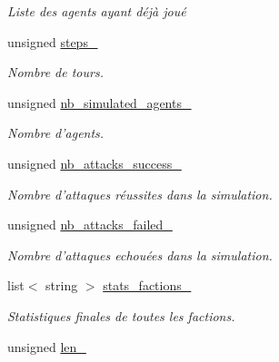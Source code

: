 \begin{DoxyCompactItemize}
\begin{DoxyCompactList}\small\item\em Liste des agents ayant déjà joué \end{DoxyCompactList}\item 
\hypertarget{classWorld_a747132820aba737926418d482571d7d3}{unsigned \hyperlink{classWorld_a747132820aba737926418d482571d7d3}{steps\-\_\-}}\label{classWorld_a747132820aba737926418d482571d7d3}

\begin{DoxyCompactList}\small\item\em Nombre de tours. \end{DoxyCompactList}\item 
\hypertarget{classWorld_a171ee3cda37e3f0d643407d7f5e22a4e}{unsigned \hyperlink{classWorld_a171ee3cda37e3f0d643407d7f5e22a4e}{nb\-\_\-simulated\-\_\-agents\-\_\-}}\label{classWorld_a171ee3cda37e3f0d643407d7f5e22a4e}

\begin{DoxyCompactList}\small\item\em Nombre d'agents. \end{DoxyCompactList}\item 
\hypertarget{classWorld_a90299b6a9d53675d0f3c7445bfaacc87}{unsigned \hyperlink{classWorld_a90299b6a9d53675d0f3c7445bfaacc87}{nb\-\_\-attacks\-\_\-success\-\_\-}}\label{classWorld_a90299b6a9d53675d0f3c7445bfaacc87}

\begin{DoxyCompactList}\small\item\em Nombre d'attaques réussites dans la simulation. \end{DoxyCompactList}\item 
\hypertarget{classWorld_a064f979cff4edc559d1a1600446781d6}{unsigned \hyperlink{classWorld_a064f979cff4edc559d1a1600446781d6}{nb\-\_\-attacks\-\_\-failed\-\_\-}}\label{classWorld_a064f979cff4edc559d1a1600446781d6}

\begin{DoxyCompactList}\small\item\em Nombre d'attaques echouées dans la simulation. \end{DoxyCompactList}\item 
\hypertarget{classWorld_aad5ba69a212d1347fa7b2999b7c5af49}{list$<$ string $>$ \hyperlink{classWorld_aad5ba69a212d1347fa7b2999b7c5af49}{stats\-\_\-factions\-\_\-}}\label{classWorld_aad5ba69a212d1347fa7b2999b7c5af49}

\begin{DoxyCompactList}\small\item\em Statistiques finales de toutes les factions. \end{DoxyCompactList}\item 
\hypertarget{classWorld_a37b008437fd73a5d4d6851a88ba61167}{unsigned \hyperlink{classWorld_a37b008437fd73a5d4d6851a88ba61167}{len\-\_\-}}\label{classWorld_a37b008437fd73a5d4d6851a88ba61167}


\end{DoxyCompactItemize}
